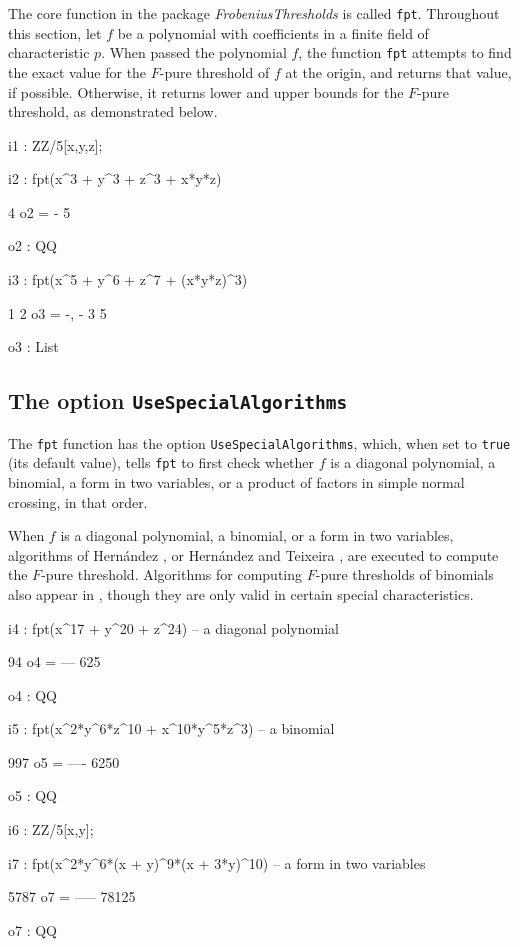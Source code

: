 \documentclass{amsart}
\begin{document}
The core function in the package \emph{FrobeniusThresholds} is called {\tt fpt}.  Throughout this section, let $f$ be a polynomial with coefficients in a finite field of characteristic $p$. When passed the polynomial $f$, the function {\tt fpt} attempts to find the exact value for the $F$-pure threshold of $f$ at the origin, and returns that value, if possible.  Otherwise, it returns lower and upper bounds for the $F$-pure threshold, as demonstrated below.

\medspace
{\small
{}
\begin{MyVerbatim}

i1 : ZZ/5[x,y,z];

i2 : fpt(x^3 + y^3 + z^3 + x*y*z)

     4
o2 = -
     5

o2 : QQ

i3 : fpt(x^5 + y^6 + z^7 + (x*y*z)^3)

      1  2
o3 = {-, -}
      3  5

o3 : List
\end{MyVerbatim}
}
\medspace

\subsection{The option {\tt UseSpecialAlgorithms}}

The {\tt fpt} function has the option {\tt UseSpecialAlgorithms}, which, when set to {\tt true} (its default value), tells {\tt fpt} to first check whether $f$ is a diagonal polynomial, a binomial, a form in two variables, or a product of factors in simple normal crossing, in that order.

When $f$ is a diagonal polynomial, a binomial, or a form in two variables, algorithms of Hern\'andez \cite{HernandezFInvariantsOfDiagonalHyp, HernandezFPureThresholdOfBinomial}, or Hern\'andez and Teixeira \cite{HernandezTeixeiraFThresholdFunctions},  are executed to compute the $F$-pure threshold.
Algorithms for computing $F$-pure thresholds of binomials also appear in \cite{ShibutaTakagiLCThresholds}, though they are only valid in certain special characteristics.

\medspace
{\small
{}
\begin{MyVerbatim}
i4 : fpt(x^17 + y^20 + z^24) -- a diagonal polynomial

      94
o4 = ---
     625

o4 : QQ

i5 : fpt(x^2*y^6*z^10 + x^10*y^5*z^3) -- a binomial

      997
o5 = ----
     6250

o5 : QQ

i6 : ZZ/5[x,y];

i7 : fpt(x^2*y^6*(x + y)^9*(x + 3*y)^10) -- a form in two variables

      5787
o7 = -----
     78125

o7 : QQ
\end{MyVerbatim}
}
\medspace
\end{document}
